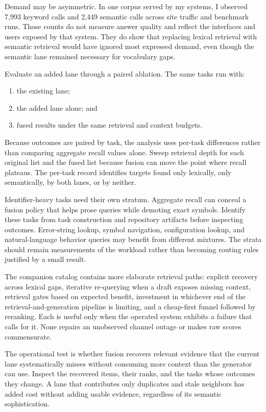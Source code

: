 Demand may be asymmetric. In one corpus served by my systems, I observed 7,993 keyword calls and 2,449 semantic calls across site traffic and benchmark runs. Those counts do not measure answer quality and reflect the interfaces and users exposed by that system. They do show that replacing lexical retrieval with semantic retrieval would have ignored most expressed demand, even though the semantic lane remained necessary for vocabulary gaps.


Evaluate an added lane through a paired ablation. The same tasks run with:

\begin{enumerate}
\def\labelenumi{\arabic{enumi}.}
\tightlist
\item
  the existing lane;
\item
  the added lane alone; and
\item
  fused results under the same retrieval and context budgets.
\end{enumerate}

Because outcomes are paired by task, the analysis uses per-task differences rather than comparing aggregate recall values alone. Sweep retrieval depth for each original list and the fused list because fusion can move the point where recall plateaus. The per-task record identifies targets found only lexically, only semantically, by both lanes, or by neither.

Identifier-heavy tasks need their own stratum. Aggregate recall can conceal a fusion policy that helps prose queries while demoting exact symbols. Identify these tasks from task construction and repository artifacts before inspecting outcomes. Error-string lookup, symbol navigation, configuration lookup, and natural-language behavior queries may benefit from different mixtures. The strata should remain measurements of the workload rather than becoming routing rules justified by a small result.

The companion catalog contains more elaborate retrieval paths: explicit recovery across lexical gaps, iterative re-querying when a draft exposes missing context, retrieval gates based on expected benefit, investment in whichever end of the retrieval-and-generation pipeline is limiting, and a cheap-first funnel followed by reranking. Each is useful only when the operated system exhibits a failure that calls for it. None repairs an unobserved channel outage or makes raw scores commensurate.

The operational test is whether fusion recovers relevant evidence that the current lane systematically misses without consuming more context than the generator can use. Inspect the recovered items, their ranks, and the tasks whose outcomes they change. A lane that contributes only duplicates and stale neighbors has added cost without adding usable evidence, regardless of its semantic sophistication.

